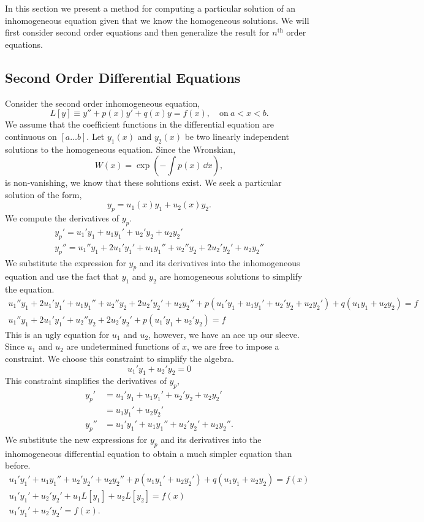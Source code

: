 In this section we present a method for computing a particular solution of
an inhomogeneous equation given that we know the homogeneous solutions.
We will first consider second order equations and then generalize the result
for $n^{\mathrm{th}}$ order equations.




\subsection{Second Order Differential Equations}




Consider the second order inhomogeneous equation,
\[
L[y] \equiv y'' + p(x)y' + q(x)y = f(x), \quad \mathrm{on}\ a < x < b.
\]
We assume that the coefficient functions in the differential equation are
continuous on $[a \ldots b]$.
Let $y_1(x)$ and $y_2(x)$ be two linearly independent solutions to the
homogeneous equation.  Since the Wronskian,
\[
W(x) = \exp \left( - \int p(x) \,\dd x \right),
\]
is non-vanishing, we know that these solutions exist.
We seek a particular solution of the form,
\[
y_p = u_1(x) y_1 + u_2(x) y_2.
\]
We compute the derivatives of $y_p$.
\begin{gather*}
  y_p' = u_1' y_1 + u_1 y_1' + u_2' y_2 + u_2 y_2' \\
  y_p'' = u_1'' y_1 + 2 u_1' y_1' + u_1 y_1'' + u_2'' y_2 + 2 u_2'y_2' + u_2 y_2''
\end{gather*}
We substitute the expression for $y_p$ and its derivatives into the 
inhomogeneous equation and use the fact that $y_1$ and $y_2$ are homogeneous
solutions to simplify the equation.
\begin{gather*}
  u_1'' y_1 + 2 u_1' y_1' + u_1 y_1'' + u_2'' y_2 + 2 u_2'y_2' + u_2 y_2''
  + p ( u_1' y_1 + u_1 y_1' + u_2' y_2 + u_2 y_2' )
  + q ( u_1 y_1 + u_2 y_2 ) = f \\
  u_1'' y_1 + 2 u_1' y_1' + u_2'' y_2 + 2 u_2'y_2'
  + p ( u_1' y_1 + u_2' y_2 ) = f
\end{gather*}
This is an ugly equation for $u_1$ and $u_2$, however, we have an ace up our 
sleeve.
Since $u_1$ and $u_2$ are undetermined functions of $x$, we are free to impose
a constraint.  We choose this constraint to simplify the algebra.
\[
u_1' y_1 + u_2' y_2 = 0
\]
This constraint simplifies the derivatives of $y_p$,
\begin{align*}
  y_p'    &= u_1' y_1 + u_1 y_1' + u_2' y_2 + u_2 y_2' \\
  &= u_1 y_1' + u_2 y_2' \\
  y_p''   &= u_1' y_1' + u_1 y_1'' + u_2'y_2' + u_2 y_2''.
\end{align*}
We substitute the new expressions for $y_p$ and its derivatives into the 
inhomogeneous differential equation to obtain a much simpler equation than 
before.
\begin{gather*}
  u_1' y_1' + u_1 y_1'' + u_2' y_2' + u_2 y_2'' + p (u_1 y_1' + u_2 y_2')
  + q (u_1 y_1 + u_2 y_2) = f(x) \\
  u_1' y_1' + u_2' y_2' + u_1 L[y_1] + u_2 L[y_2] = f(x) \\
  u_1' y_1' + u_2' y_2' = f(x).
\end{gather*}


